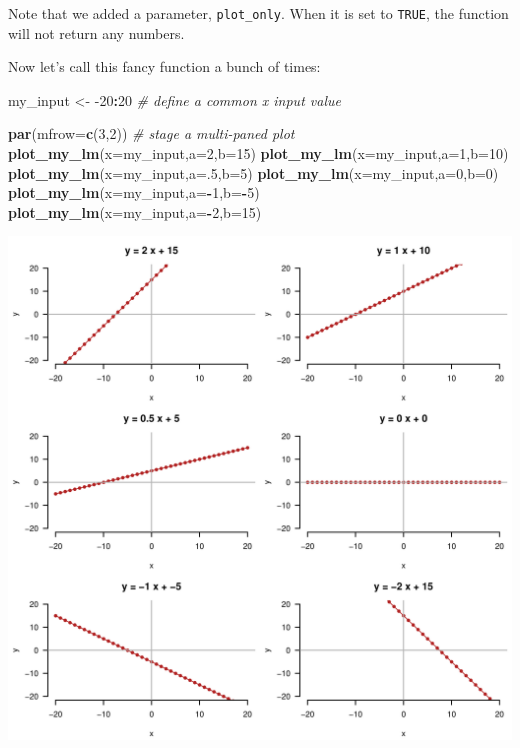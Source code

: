 \documentclass[
]{book}
\newenvironment{Shaded}{\begin{snugshade}}{\end{snugshade}}
\newcommand{\CommentTok}[1]{\textcolor[rgb]{0.56,0.35,0.01}{\textit{#1}}}
\newcommand{\DataTypeTok}[1]{\textcolor[rgb]{0.13,0.29,0.53}{#1}}
\newcommand{\DecValTok}[1]{\textcolor[rgb]{0.00,0.00,0.81}{#1}}
\newcommand{\KeywordTok}[1]{\textcolor[rgb]{0.13,0.29,0.53}{\textbf{#1}}}
\newcommand{\NormalTok}[1]{#1}
\newcommand{\OperatorTok}[1]{\textcolor[rgb]{0.81,0.36,0.00}{\textbf{#1}}}
\newcommand{\StringTok}[1]{\textcolor[rgb]{0.31,0.60,0.02}{#1}}
\begin{document}
Note that we added a parameter, \texttt{plot\_only}. When it is set to \texttt{TRUE}, the function will not return any numbers.

Now let's call this fancy function a bunch of times:

\begin{Shaded}
\begin{Highlighting}[]
\NormalTok{my_input <-}\StringTok{ }\DecValTok{-20}\OperatorTok{:}\DecValTok{20} \CommentTok{# define a common x input value}

\KeywordTok{par}\NormalTok{(}\DataTypeTok{mfrow=}\KeywordTok{c}\NormalTok{(}\DecValTok{3}\NormalTok{,}\DecValTok{2}\NormalTok{)) }\CommentTok{# stage a multi-paned plot}
\KeywordTok{plot_my_lm}\NormalTok{(}\DataTypeTok{x=}\NormalTok{my_input,}\DataTypeTok{a=}\DecValTok{2}\NormalTok{,}\DataTypeTok{b=}\DecValTok{15}\NormalTok{)}
\KeywordTok{plot_my_lm}\NormalTok{(}\DataTypeTok{x=}\NormalTok{my_input,}\DataTypeTok{a=}\DecValTok{1}\NormalTok{,}\DataTypeTok{b=}\DecValTok{10}\NormalTok{)}
\KeywordTok{plot_my_lm}\NormalTok{(}\DataTypeTok{x=}\NormalTok{my_input,}\DataTypeTok{a=}\NormalTok{.}\DecValTok{5}\NormalTok{,}\DataTypeTok{b=}\DecValTok{5}\NormalTok{)}
\KeywordTok{plot_my_lm}\NormalTok{(}\DataTypeTok{x=}\NormalTok{my_input,}\DataTypeTok{a=}\DecValTok{0}\NormalTok{,}\DataTypeTok{b=}\DecValTok{0}\NormalTok{)}
\KeywordTok{plot_my_lm}\NormalTok{(}\DataTypeTok{x=}\NormalTok{my_input,}\DataTypeTok{a=}\OperatorTok{-}\DecValTok{1}\NormalTok{,}\DataTypeTok{b=}\OperatorTok{-}\DecValTok{5}\NormalTok{)}
\KeywordTok{plot_my_lm}\NormalTok{(}\DataTypeTok{x=}\NormalTok{my_input,}\DataTypeTok{a=}\OperatorTok{-}\DecValTok{2}\NormalTok{,}\DataTypeTok{b=}\DecValTok{15}\NormalTok{)}
\end{Highlighting}
\end{Shaded}

\includegraphics{figures/unnamed-chunk-219-1.pdf}
\end{document}
